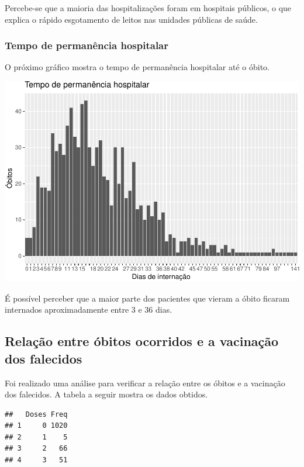 \documentclass[
]{article}
\begin{document}
Percebe-se que a maioria das hospitalizações foram em hospitais
públicos, o que explica o rápido esgotamento de leitos nas unidades
públicas de saúde.

\hypertarget{tempo-de-permanuxeancia-hospitalar}{%
\subsubsection{Tempo de permanência
hospitalar}\label{tempo-de-permanuxeancia-hospitalar}}

O próximo gráfico mostra o tempo de permanência hospitalar até o óbito.

\includegraphics{tf-matheus-willian_files/figure-latex/unnamed-chunk-5-1.pdf}

É possível perceber que a maior parte dos pacientes que vieram a óbito
ficaram internados aproximadamente entre 3 e 36 dias.

\hypertarget{relauxe7uxe3o-entre-uxf3bitos-ocorridos-e-a-vacinauxe7uxe3o-dos-falecidos}{%
\subsection{Relação entre óbitos ocorridos e a vacinação dos
falecidos}\label{relauxe7uxe3o-entre-uxf3bitos-ocorridos-e-a-vacinauxe7uxe3o-dos-falecidos}}

Foi realizado uma análise para verificar a relação entre os óbitos e a
vacinação dos falecidos. A tabela a seguir mostra os dados obtidos.

\begin{verbatim}
##   Doses Freq
## 1     0 1020
## 2     1    5
## 3     2   66
## 4     3   51
\end{verbatim}
\end{document}

